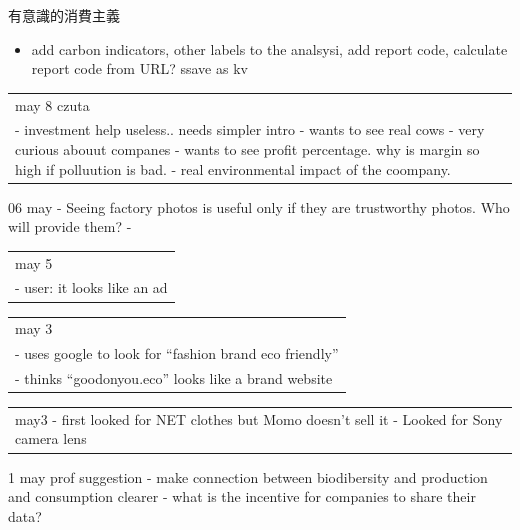 \documentclass[
  letterpaper,
  DIV=11,
  numbers=noendperiod]{scrartcl}
\providecommand{\tightlist}{%
  \setlength{\itemsep}{0pt}\setlength{\parskip}{0pt}}\usepackage{longtable,booktabs,array}
\begin{document}
有意識的消費主義

\begin{itemize}
\tightlist
\item
  add carbon indicators, other labels to the analsysi, add report code,
  calculate report code from URL? ssave as kv
\end{itemize}

\begin{longtable}[]{@{}
  >{\raggedright\arraybackslash}p{}@{}}
\toprule\noalign{}
\endhead
\bottomrule\noalign{}
\endlastfoot
may 8 czuta \\
- investment help useless.. needs simpler intro - wants to see real cows
- very curious abouut companes - wants to see profit percentage. why is
margin so high if polluution is bad. - real environmental impact of the
coompany. \\
\end{longtable}

06 may - Seeing factory photos is useful only if they are trustworthy
photos. Who will provide them? -

\begin{longtable}[]{@{}l@{}}
\toprule\noalign{}
\endhead
\bottomrule\noalign{}
\endlastfoot
may 5 \\
- user: it looks like an ad \\
\end{longtable}

\begin{longtable}[]{@{}l@{}}
\toprule\noalign{}
\endhead
\bottomrule\noalign{}
\endlastfoot
may 3 \\
- uses google to look for ``fashion brand eco friendly'' \\
- thinks ``goodonyou.eco'' looks like a brand website \\
\end{longtable}

\begin{longtable}[]{@{}
  >{\raggedright\arraybackslash}p{}@{}}
\toprule\noalign{}
\endhead
\bottomrule\noalign{}
\endlastfoot
may3 - first looked for NET clothes but Momo doesn't sell it - Looked
for Sony camera lens \\
\end{longtable}

1 may prof suggestion - make connection between biodibersity and
production and consumption clearer - what is the incentive for companies
to share their data?
\end{document}
